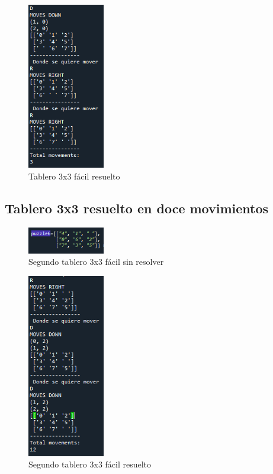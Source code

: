 \documentclass{article}
\begin{document}
        \begin{figure}[H]
        \centering
        \includegraphics[width=0.3\textwidth]{puzzles/puzzleSolved.PNG}
        \caption{Tablero 3x3 fácil resuelto}
        \label{fig:ger}
        \end{figure}
    
    \subsection{Tablero 3x3 resuelto en doce movimientos}
        \begin{figure}[H]
        \centering
        \includegraphics[width=0.3\textwidth]{puzzles/puzzle2.PNG}
        \caption{Segundo tablero 3x3 fácil sin resolver}
        \label{fig:ger}
        \end{figure}
        
        \begin{figure}[H]
        \centering
        \includegraphics[width=0.3\textwidth]{puzzles/puzzle2Solved.PNG}
        \caption{Segundo tablero 3x3 fácil resuelto}
        \label{fig:ger}
        \end{figure}
        
\end{document}

